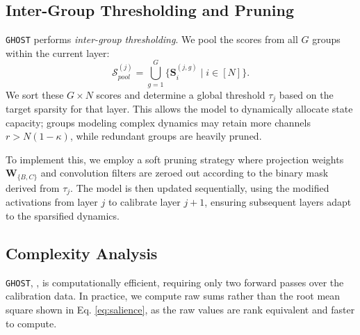 \documentclass{article}
\theoremstyle{plain}
\theoremstyle{definition}
\theoremstyle{remark}
\begin{document}
\subsection{Inter-Group Thresholding and Pruning}
\label{subsec:selection}
\texttt{GHOST} performs \textit{inter-group thresholding}. We pool the scores from all $G$ groups within the current layer:
\begin{equation*}
\mathcal{S}_{pool}^{(j)} = \bigcup_{g=1}^{G} \{ \bm{S}^{(j, g)}_{i} \mid i \in [N] \}.
\end{equation*}
We sort these $G \times N$ scores and determine a global threshold $\tau_j$ based on the target sparsity for that layer. This allows the model to dynamically allocate state capacity; groups modeling complex dynamics may retain more channels $r > N(1-\kappa)$, while redundant groups are heavily pruned.

To implement this, we employ a soft pruning strategy where projection weights $\bm{W}_{\{B, C\}}$ and convolution filters are zeroed out according to the binary mask derived from $\tau_j$. The model is then updated sequentially, using the modified activations from layer $j$ to calibrate layer $j+1$, ensuring subsequent layers adapt to the sparsified dynamics.


\subsection{Complexity Analysis}
\label{subsec:complexity}

\texttt{GHOST}, , is computationally efficient, requiring only two forward passes over the calibration data. In practice, we compute raw sums rather than the root mean square shown in Eq. \eqref{eq:salience}, as the raw values are rank equivalent and faster to compute.
\end{document}
